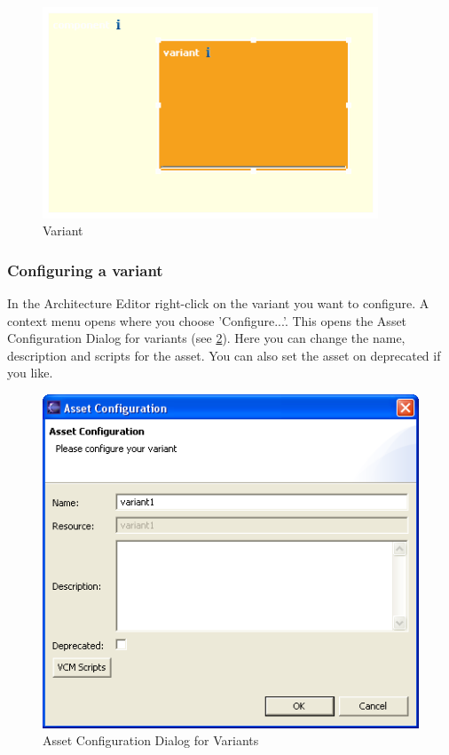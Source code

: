 \begin{figure}[h!]
\begin{center}
\includegraphics[width=10cm]{variant.png}
   \caption{Variant}
\label{variant}
\end{center}
\end{figure}\par


\subsubsection{Configuring a variant}
In the Architecture Editor right-click on the variant you want to configure. 
A context menu opens where you choose 'Configure...'. This opens the Asset Configuration Dialog
for variants (see \ref{configvar}). Here you can change the name, description and scripts for the
asset. You can also set the asset on deprecated if you like.

\begin{figure}[h!]
\begin{center}
\includegraphics[width=12cm]{configvar.png}
   \caption{Asset Configuration Dialog for Variants}
\label{configvar}
\end{center}
\end{figure}\par

